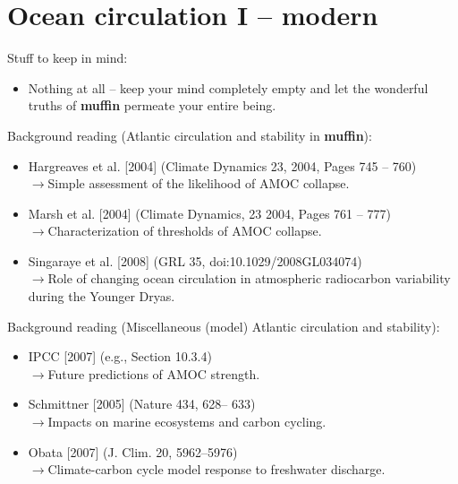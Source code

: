 
\cleardoublepage


\chapter{Ocean circulation I -- modern}\label{ch:ocean-circulation-I}

\hfill \break

\noindent Stuff to keep in mind:

\begin{itemize}
\item Nothing at all – keep your mind completely empty and let the wonderful truths of \textbf{muffin} permeate your entire being.
\end{itemize}

\vspace{2mm}
\noindent Background reading (Atlantic circulation and stability in \textbf{muffin}):

\vspace{2mm}
\begin{itemize}
\item Hargreaves et al. [2004] (Climate Dynamics 23, 2004, Pages 745 – 760)
\\\(\rightarrow\)Simple assessment of the likelihood of AMOC collapse.
\item Marsh et al. [2004] (Climate Dynamics, 23 2004, Pages 761 – 777)
\\\(\rightarrow\)Characterization of thresholds of AMOC collapse.
\item Singaraye et al. [2008] (GRL 35, doi:10.1029/2008GL034074)
\\\(\rightarrow\)Role of changing ocean circulation in atmospheric radiocarbon variability during the Younger Dryas.
\end{itemize}

\vspace{2mm}
\noindent Background reading (Miscellaneous (model) Atlantic circulation and stability):

\vspace{2mm}
\begin{itemize}
\item IPCC [2007] (e.g., Section 10.3.4)
\\\(\rightarrow\)Future predictions of AMOC strength.
\item Schmittner [2005] (Nature 434, 628– 633)
\\\(\rightarrow\)Impacts on marine ecosystems and carbon cycling.
\item Obata [2007] (J. Clim. 20, 5962–5976)
\\\(\rightarrow\)Climate-carbon cycle model response to freshwater discharge.
\end{itemize}

